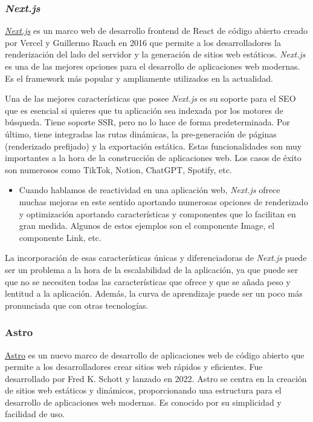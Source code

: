 \subsubsection{\textit{Next.js}}

\href{https://nextjs.org/}{\textit{Next.js}} es un marco web de desarrollo frontend de React de código abierto creado por Vercel y Guillermo Rauch en 2016 que permite a los desarrolladores la renderización del lado del servidor y la generación de sitios web estáticos. \textit{Next.js} es una de las mejores opciones para el desarrollo de aplicaciones web modernas. Es el framework más popular y ampliamente utilizados en la actualidad.

Una de las mejores características que posee \textit{Next.js} es su soporte para el SEO que es esencial si quieres que tu aplicación sea indexada por los motores de búsqueda. Tiene soporte SSR, pero no lo hace de forma predeterminada. Por último, tiene integradas las rutas dinámicas, la pre-generación de páginas (renderizado prefijado) y la exportación estática. Estas funcionalidades son muy importantes a la hora de la construcción de aplicaciones web. Los casos de éxito son numerosos como TikTok, Notion, ChatGPT, Spotify, etc.

\begin{itemize}
  \item[\bien] Cuando hablamos de reactividad en una aplicación web, \textit{Next.js} ofrece muchas mejoras en este sentido aportando numerosas opciones de renderizado y optimización aportando características y componentes que lo facilitan en gran medida. Algunos de estos ejemplos son el componente Image, el componente Link, etc.
\end{itemize}

La incorporación de esas características únicas y diferenciadoras de \textit{Next.js} puede ser un problema a la hora de la escalabilidad de la aplicación, ya que puede ser que no se necesiten todas las características que ofrece y que se añada peso y lentitud a la aplicación. Además, la curva de aprendizaje puede ser un poco más pronunciada que con otras tecnologías.

\subsubsection{Astro}

\href{https://astro.build/}{Astro} es un nuevo marco de desarrollo de aplicaciones web de código abierto que permite a los desarrolladores crear sitios web rápidos y eficientes. Fue desarrollado por Fred K. Schott y lanzado en 2022. Astro se centra en la creación de sitios web estáticos y dinámicos, proporcionando una estructura para el desarrollo de aplicaciones web modernas. Es conocido por su simplicidad y facilidad de uso.

